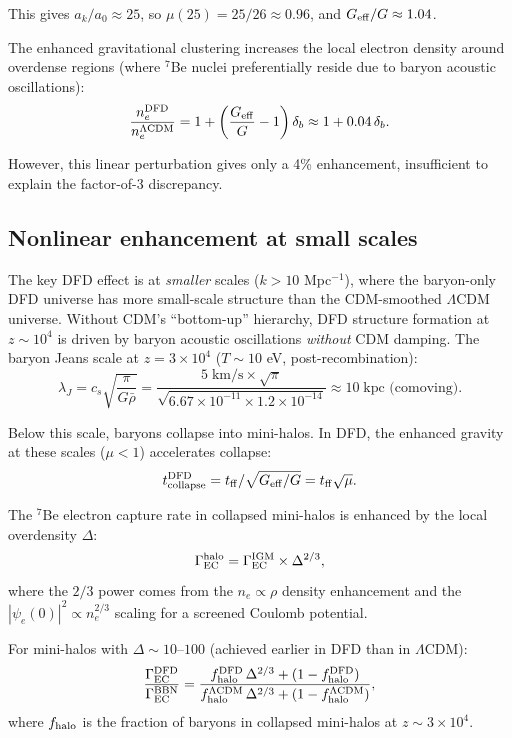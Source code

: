 \documentclass[11pt]{article}
\newcommand{\ee}[1]{\times 10^{#1}}
\begin{document}
This gives $a_k/a_0 \approx 25$, so $\mu(25) = 25/26 \approx 0.96$, and $G_{\rm eff}/G \approx 1.04$.

The enhanced gravitational clustering increases the local electron density around overdense regions (where $^7$Be nuclei preferentially reside due to baryon acoustic oscillations):
\begin{equation}
\frac{n_e^{\rm DFD}}{n_e^{\Lambda\rm CDM}} = 1 + \left(\frac{G_{\rm eff}}{G} - 1\right)\delta_b \approx 1 + 0.04\,\delta_b.
\end{equation}

However, this linear perturbation gives only a 4\% enhancement, insufficient to explain the factor-of-3 discrepancy.

\subsection{Nonlinear enhancement at small scales}

The key DFD effect is at \emph{smaller} scales ($k > 10$ Mpc$^{-1}$), where the baryon-only DFD universe has more small-scale structure than the CDM-smoothed $\Lambda$CDM universe. Without CDM's ``bottom-up'' hierarchy, DFD structure formation at $z \sim 10^4$ is driven by baryon acoustic oscillations \emph{without} CDM damping. The baryon Jeans scale at $z = 3\ee{4}$ ($T \sim 10$ eV, post-recombination):
\begin{equation}
\lambda_J = c_s\sqrt{\frac{\pi}{G\bar\rho}} = \frac{5\;\text{km/s}\times\sqrt{\pi}}{\sqrt{6.67\ee{-11}\times 1.2\ee{-14}}} \approx 10\;\text{kpc (comoving)}.
\end{equation}

Below this scale, baryons collapse into mini-halos. In DFD, the enhanced gravity at these scales ($\mu < 1$) accelerates collapse:
\begin{equation}
t_{\rm collapse}^{\rm DFD} = t_{\rm ff}/\sqrt{G_{\rm eff}/G} = t_{\rm ff}\sqrt{\mu}.
\end{equation}

The $^7$Be electron capture rate in collapsed mini-halos is enhanced by the local overdensity $\Delta$:
\begin{equation}
\Gamma_{\rm EC}^{\rm halo} = \Gamma_{\rm EC}^{\rm IGM} \times \Delta^{2/3},
\end{equation}
where the $2/3$ power comes from the $n_e \propto \rho$ density enhancement and the $|\psi_e(0)|^2 \propto n_e^{2/3}$ scaling for a screened Coulomb potential.

For mini-halos with $\Delta \sim 10$--$100$ (achieved earlier in DFD than in $\Lambda$CDM):
\begin{equation}
\frac{\Gamma_{\rm EC}^{\rm DFD}}{\Gamma_{\rm EC}^{\rm BBN}} = \frac{f_{\rm halo}^{\rm DFD}\,\Delta^{2/3} + (1-f_{\rm halo}^{\rm DFD})}{f_{\rm halo}^{\Lambda\rm CDM}\,\Delta^{2/3} + (1-f_{\rm halo}^{\Lambda\rm CDM})},
\end{equation}
where $f_{\rm halo}$ is the fraction of baryons in collapsed mini-halos at $z \sim 3\ee{4}$.
\end{document}
